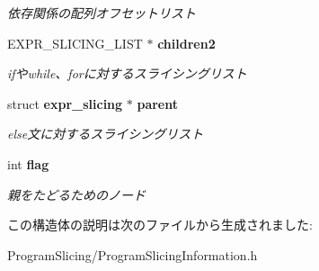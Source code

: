 \begin{DoxyCompactItemize}
\begin{DoxyCompactList}\small\item\em 依存関係の配列オフセットリスト \item\end{DoxyCompactList}\item 
EXPR\_\-SLICING\_\-LIST $\ast$ {\bf children2}\label{structexpr__slicing_ad3287a356446f273cbb3f9fcd2f83788}

\begin{DoxyCompactList}\small\item\em ifやwhile、forに対するスライシングリスト \item\end{DoxyCompactList}\item 
struct {\bf expr\_\-slicing} $\ast$ {\bf parent}\label{structexpr__slicing_a4b70a026092925669b2dd281d0af849f}

\begin{DoxyCompactList}\small\item\em else文に対するスライシングリスト \item\end{DoxyCompactList}\item 
int {\bf flag}\label{structexpr__slicing_adf916204820072417ed73a32de1cefcf}

\begin{DoxyCompactList}\small\item\em 親をたどるためのノード \item\end{DoxyCompactList}\end{DoxyCompactItemize}


この構造体の説明は次のファイルから生成されました:\begin{DoxyCompactItemize}
\item 
ProgramSlicing/ProgramSlicingInformation.h\end{DoxyCompactItemize}
